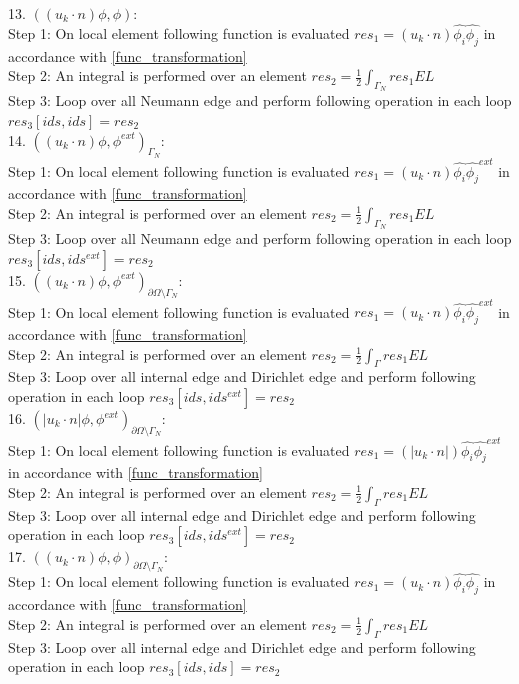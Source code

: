 \documentclass[a4paper,12pt]{book}
\begin{document}
13. $((u_k \cdot n)\phi , \phi)$:\\
Step 1: On local element following function is evaluated $res_1 = (u_k \cdot n) \hat{\phi_i} \hat{\phi_j} $ in accordance with \ref{func_transformation}\\
Step 2: An integral is performed over an element $res_2 = \frac{1}{2}  \int_{\Gamma_N} res_1 EL $\\
Step 3: Loop over all Neumann edge and perform following operation in each loop $res_3[ids,ids] = res_2$\\

14. $((u_k \cdot n)\phi,\phi^{ext})_{\Gamma_N}$:\\
Step 1: On local element following function is evaluated $res_1 = (u_k \cdot n) \hat{\phi_i} \hat{\phi_j}^{ext} $ in accordance with \ref{func_transformation}\\
Step 2: An integral is performed over an element $res_2 = \frac{1}{2} \int_{\Gamma_N} res_1 EL $\\
Step 3: Loop over all Neumann edge and perform following operation in each loop $res_3[ids,ids^{ext}] = res_2$\\

15. $((u_k \cdot n)\phi,\phi^{ext})_{\partial \Omega \setminus \Gamma_N}$:\\
Step 1: On local element following function is evaluated $res_1 = (u_k \cdot n) \hat{\phi_i} \hat{\phi_j}^{ext} $ in accordance with \ref{func_transformation}\\
Step 2: An integral is performed over an element $res_2 = \frac{1}{2} \int_{\Gamma} res_1 EL $\\
Step 3: Loop over all internal edge and Dirichlet edge and perform following operation in each loop $res_3[ids,ids^{ext}] = res_2$\\

16. $(|u_k \cdot n| \phi,\phi^{ext})_{\partial \Omega \setminus \Gamma_N}$:\\
Step 1: On local element following function is evaluated $res_1 = (|u_k \cdot n|) \hat{\phi_i} \hat{\phi_j}^{ext} $ in accordance with \ref{func_transformation}\\
Step 2: An integral is performed over an element $res_2 = \frac{1}{2} \int_{\Gamma} res_1 EL $\\
Step 3: Loop over all internal edge and Dirichlet edge and perform following operation in each loop $res_3[ids,ids^{ext}] = res_2$\\

17. $((u_k \cdot n)\phi,\phi)_{\partial \Omega \setminus \Gamma_N}$:\\
Step 1: On local element following function is evaluated $res_1 = (u_k \cdot n) \hat{\phi_i} \hat{\phi_j} $ in accordance with \ref{func_transformation}\\
Step 2: An integral is performed over an element $res_2 = \frac{1}{2} \int_{\Gamma} res_1 EL $\\
Step 3: Loop over all internal edge and Dirichlet edge and perform following operation in each loop $res_3[ids,ids] = res_2$\\
\end{document}
